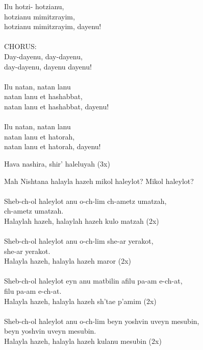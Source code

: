 \documentclass[twoside,14pt,openany,letterpaper]{memoir}%
\begin{document}
Ilu hotzi- hotzianu,\\
hotzianu mimitzrayim,\\
hotzianu mimitzrayim, dayenu!\\
\\
\footnotesize{CHORUS:}\normalsize\\
Day-dayenu, day-dayenu,\\
day-dayenu, dayenu dayenu!\\
\\
Ilu natan, natan lanu\\
natan lanu et hashabbat,\\
natan lanu et hashabbat, dayenu!\\
\\
Ilu natan, natan lanu\\
natan lanu et hatorah,\\
natan lanu et hatorah, dayenu!\\


Hava nashira, shir’ haleluyah (3x)


Mah Nishtana halayla hazeh mikol haleylot? Mikol haleylot?\\
\\
Sheb-ch-ol haleylot anu o-ch-lim ch-ametz umatzah,\\
ch-ametz umatzah.\\
Halaylah hazeh, halaylah hazeh kulo matzah (2x)\\
\\
Sheb-ch-ol haleylot anu o-ch-lim she-ar yerakot,\\
she-ar yerakot.\\
Halayla hazeh, halayla hazeh maror (2x)\\
\\
Sheb-ch-ol haleylot eyn anu matbilin afilu pa-am e-ch-at,\\
filu pa-am e-ch-at.\\
Halayla hazeh, halayla hazeh sh’tae p’amim (2x)\\
\\
Sheb-ch-ol haleylot anu o-ch-lim beyn yoshvin uveyn mesubin,\\
beyn yoshvin uveyn mesubin.\\
Halayla hazeh, halayla hazeh kulanu mesubin (2x)\\
\end{document}
